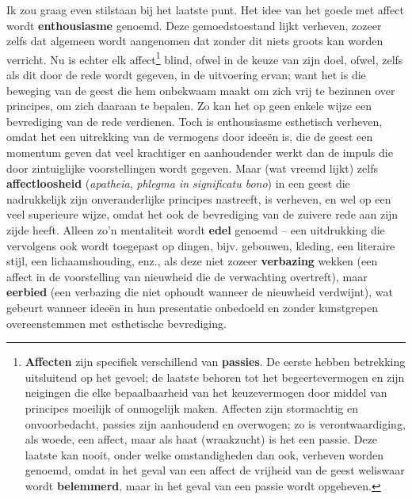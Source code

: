 Ik zou graag even stilstaan bij het laatste punt. Het idee van het goede met affect wordt \textbf{enthousiasme} genoemd. Deze gemoedstoestand lijkt verheven, zozeer zelfs dat algemeen wordt aangenomen dat zonder dit niets groots kan worden verricht. Nu is echter elk affect\footnote{\textbf{Affecten} zijn specifiek verschillend van \textbf{passies}. De eerste hebben betrekking uitsluitend op het gevoel; de laatste behoren tot het begeertevermogen en zijn neigingen die elke bepaalbaarheid van het keuzevermogen door middel van principes moeilijk of onmogelijk maken. Affecten zijn stormachtig en onvoorbedacht, passies zijn aanhoudend en overwogen; zo is verontwaardiging, als woede, een affect, maar als haat (wraakzucht) is het een passie. Deze laatste kan nooit, onder welke omstandigheden dan ook, verheven worden genoemd, omdat in het geval van een affect de vrijheid van de geest weliswaar wordt \textbf{belemmerd}, maar in het geval van een passie wordt opgeheven.} blind, ofwel in de keuze van zijn doel, ofwel, zelfs als dit door de rede wordt gegeven, in de uitvoering ervan; want het is die beweging van de geest die hem onbekwaam maakt om zich vrij te bezinnen over principes, om zich daaraan te bepalen. Zo kan het op geen enkele wijze een bevrediging van de rede verdienen. Toch is enthousiasme esthetisch verheven, omdat het een uitrekking van de vermogens door ideeën is, die de geest een momentum geven dat veel krachtiger en aanhoudender werkt dan de impuls die door zintuiglijke voorstellingen wordt gegeven. Maar (wat vreemd lijkt) zelfs \textbf{affectloosheid} (\textit{apatheia}, \textit{phlegma in significatu bono}) in een geest die nadrukkelijk zijn onveranderlijke principes nastreeft, is verheven, en wel op een veel superieure wijze, omdat het ook de bevrediging van de zuivere rede aan zijn zijde heeft. Alleen zo'n mentaliteit wordt \textbf{edel} genoemd – een uitdrukking die vervolgens ook wordt toegepast op dingen, bijv. gebouwen, kleding, een literaire stijl, een lichaamshouding, enz., als deze niet zozeer \textbf{verbazing} wekken (een affect in de voorstelling van nieuwheid die de verwachting overtreft), maar \textbf{eerbied} (een verbazing die niet ophoudt wanneer de nieuwheid verdwijnt), wat gebeurt wanneer ideeën in hun presentatie onbedoeld en zonder kunstgrepen overeenstemmen met esthetische bevrediging.

